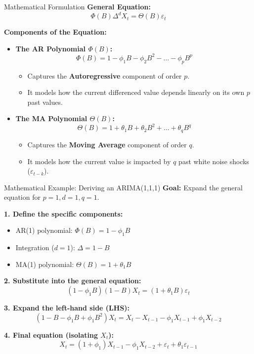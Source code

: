 \documentclass[aspectratio=169]{beamer}
\begin{document}
\begin{frame}{Mathematical Formulation}
\textbf{General Equation:}
\[
\Phi(B)\Delta^d X_t = \Theta(B)\varepsilon_t
\]

\textbf{Components of the Equation:}
\begin{itemize}
    \item \textbf{The AR Polynomial $\Phi(B)$:}
    \[ \Phi(B) = 1 - \phi_1 B - \phi_2 B^2 - \dots - \phi_p B^p \]
    \begin{itemize}
        \item Captures the \textbf{Autoregressive} component of order $p$.
        \item It models how the current differenced value depends linearly on its own $p$ past values.
    \end{itemize}
    
    \vspace{0.2cm}
    
    \item \textbf{The MA Polynomial $\Theta(B)$:}
    \[ \Theta(B) = 1 + \theta_1 B + \theta_2 B^2 + \dots + \theta_q B^q \]
    \begin{itemize}
        \item Captures the \textbf{Moving Average} component of order $q$.
        \item It models how the current value is impacted by $q$ past white noise shocks ($\varepsilon_{t-k}$).
    \end{itemize}
\end{itemize}
\end{frame}

\begin{frame}{Mathematical Example: Deriving an ARIMA(1,1,1)}
\textbf{Goal:} Expand the general equation for $p=1, d=1, q=1$.

\vspace{0.2cm}

\textbf{1. Define the specific components:}
\begin{itemize}
    \item AR(1) polynomial: $\Phi(B) = 1 - \phi_1 B$
    \item Integration ($d=1$): $\Delta = 1 - B$
    \item MA(1) polynomial: $\Theta(B) = 1 + \theta_1 B$
\end{itemize}

\vspace{0.2cm}

\textbf{2. Substitute into the general equation:}
\[
(1 - \phi_1 B)(1 - B)X_t = (1 + \theta_1 B)\varepsilon_t
\]

\vspace{0.2cm}

\textbf{3. Expand the left-hand side (LHS):}
\[
(1 - B - \phi_1 B + \phi_1 B^2)X_t = X_t - X_{t-1} - \phi_1 X_{t-1} + \phi_1 X_{t-2}
\]

\vspace{0.2cm}

\textbf{4. Final equation (isolating $X_t$):}
\[
X_t = (1 + \phi_1)X_{t-1} - \phi_1 X_{t-2} + \varepsilon_t + \theta_1 \varepsilon_{t-1}
\]

\end{frame}
\end{document}
